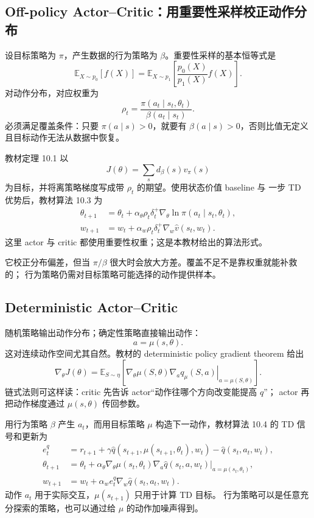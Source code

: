 \documentclass[11pt,a4paper,fontset=fandol]{ctexart}
\newcommand{\E}{\mathbb{E}}
\begin{document}
\subsection{Off-policy Actor--Critic：用重要性采样校正动作分布}

设目标策略为 \(\pi\)，产生数据的行为策略为 \(\beta\)。重要性采样的基本恒等式是
\[
\E_{X\sim p_0}[f(X)]
=\E_{X\sim p_1}\!\left[
\frac{p_0(X)}{p_1(X)}f(X)
\right].
\]
对动作分布，对应权重为
\[
\boxed{\rho_t=\frac{\pi(a_t\mid s_t,\theta_t)}
{\beta(a_t\mid s_t)}}.
\]
必须满足覆盖条件：只要 \(\pi(a\mid s)>0\)，就要有
\(\beta(a\mid s)>0\)，否则比值无定义且目标动作无法从数据中恢复。

教材定理 10.1 以
\[
J(\theta)=\sum_s d_\beta(s)v_\pi(s)
\]
为目标，并将离策略梯度写成带 \(\rho_t\) 的期望。使用状态价值 baseline 与
一步 TD 优势后，教材算法 10.3 为
\[
\boxed{
\begin{aligned}
\theta_{t+1}
&=\theta_t+\alpha_\theta\rho_t\delta_t^+
\nabla_\theta\ln\pi(a_t\mid s_t,\theta_t),\\
w_{t+1}
&=w_t+\alpha_w\rho_t\delta_t^+
\nabla_w\hat v(s_t,w_t).
\end{aligned}}
\]
这里 actor 与 critic 都使用重要性权重；这是本教材给出的算法形式。

\begin{warningbox}[重要性采样的代价]
它校正分布偏差，但当 \(\pi/\beta\) 很大时会放大方差。覆盖不足不是靠权重就能补救的；
行为策略仍需对目标策略可能选择的动作提供样本。
\end{warningbox}

\subsection{Deterministic Actor--Critic}

随机策略输出动作分布；确定性策略直接输出动作：
\[
\boxed{a=\mu(s,\theta)}.
\]
这对连续动作空间尤其自然。教材的 deterministic policy gradient theorem 给出
\[
\boxed{
\nabla_\theta J(\theta)
=\E_{S\sim\eta}\!\left[
\nabla_\theta\mu(S,\theta)
\left.\nabla_a q_\mu(S,a)\right|_{a=\mu(S,\theta)}
\right]}.
\]
链式法则可这样读：critic 先告诉 actor“动作往哪个方向改变能提高 \(q\)”；
actor 再把动作梯度通过 \(\mu(s,\theta)\) 传回参数。

用行为策略 \(\beta\) 产生 \(a_t\)，而用目标策略 \(\mu\) 构造下一动作，教材算法
10.4 的 TD 信号和更新为
\[
\begin{aligned}
e_t^q
&=r_{t+1}
+\gamma\hat q(s_{t+1},\mu(s_{t+1},\theta_t),w_t)
-\hat q(s_t,a_t,w_t),\\
\theta_{t+1}
&=\theta_t+\alpha_\theta
\nabla_\theta\mu(s_t,\theta_t)
\left.\nabla_a\hat q(s_t,a,w_t)\right|_{a=\mu(s_t,\theta_t)},\\
w_{t+1}
&=w_t+\alpha_w e_t^q\nabla_w\hat q(s_t,a_t,w_t).
\end{aligned}
\]
动作 \(a_t\) 用于实际交互，\(\mu(s_{t+1})\) 只用于计算 TD 目标。
行为策略可以是任意充分探索的策略，也可以通过给 \(\mu\) 的动作加噪声得到。
\end{document}
